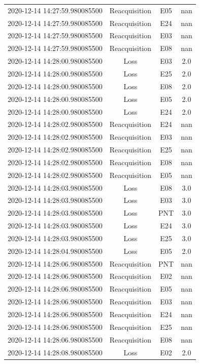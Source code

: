 \begin{enumerate}
\begin{longtabu}{cccc}
2020{-}12{-}14 14:27:59.980085500&Reacquisition&E05&nan\\%
2020{-}12{-}14 14:27:59.980085500&Reacquisition&E24&nan\\%
2020{-}12{-}14 14:27:59.980085500&Reacquisition&E03&nan\\%
2020{-}12{-}14 14:27:59.980085500&Reacquisition&E08&nan\\%
2020{-}12{-}14 14:28:00.980085500&Loss&E03&2.0\\%
2020{-}12{-}14 14:28:00.980085500&Loss&E25&2.0\\%
2020{-}12{-}14 14:28:00.980085500&Loss&E08&2.0\\%
2020{-}12{-}14 14:28:00.980085500&Loss&E05&2.0\\%
2020{-}12{-}14 14:28:00.980085500&Loss&E24&2.0\\%
2020{-}12{-}14 14:28:02.980085500&Reacquisition&E24&nan\\%
2020{-}12{-}14 14:28:02.980085500&Reacquisition&E03&nan\\%
2020{-}12{-}14 14:28:02.980085500&Reacquisition&E25&nan\\%
2020{-}12{-}14 14:28:02.980085500&Reacquisition&E08&nan\\%
2020{-}12{-}14 14:28:02.980085500&Reacquisition&E05&nan\\%
2020{-}12{-}14 14:28:03.980085500&Loss&E08&3.0\\%
2020{-}12{-}14 14:28:03.980085500&Loss&E03&3.0\\%
2020{-}12{-}14 14:28:03.980085500&Loss&PNT&3.0\\%
2020{-}12{-}14 14:28:03.980085500&Loss&E24&3.0\\%
2020{-}12{-}14 14:28:03.980085500&Loss&E25&3.0\\%
2020{-}12{-}14 14:28:04.980085500&Loss&E05&2.0\\%
2020{-}12{-}14 14:28:06.980085500&Reacquisition&PNT&nan\\%
2020{-}12{-}14 14:28:06.980085500&Reacquisition&E02&nan\\%
2020{-}12{-}14 14:28:06.980085500&Reacquisition&E05&nan\\%
2020{-}12{-}14 14:28:06.980085500&Reacquisition&E03&nan\\%
2020{-}12{-}14 14:28:06.980085500&Reacquisition&E24&nan\\%
2020{-}12{-}14 14:28:06.980085500&Reacquisition&E25&nan\\%
2020{-}12{-}14 14:28:06.980085500&Reacquisition&E08&nan\\%
2020{-}12{-}14 14:28:08.980085500&Loss&E02&2.0\\%

\end{longtabu}
\end{enumerate}
